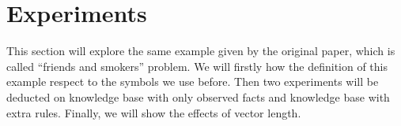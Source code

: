 
\section{Experiments}

This section will explore the same example given by the original paper, which is called ``friends and smokers'' problem. We will firstly how the definition of this example respect to the symbols we use before. Then two experiments will be deducted on knowledge base with only observed facts and knowledge base with extra rules. Finally, we will show the effects of vector length.








